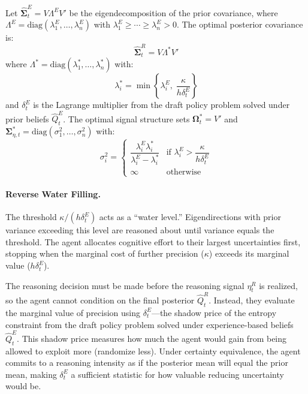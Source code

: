 \begin{proposition}
    Let $\hat{\boldsymbol{\Sigma}}^E_t = V \Lambda^E V'$ be the eigendecomposition of the prior covariance, where $\Lambda^E = \mathrm{diag}(\lambda_1^E, \ldots, \lambda_n^E)$ with $\lambda_1^E \geq \cdots \geq \lambda_n^E > 0$. The optimal posterior covariance is:
    \begin{equation}
        \hat{\boldsymbol{\Sigma}}^R_t = V \Lambda^* V'
    \end{equation}
    where $\Lambda^* = \mathrm{diag}(\lambda_1^*, \ldots, \lambda_n^*)$ with:
    \begin{equation}
        \lambda_i^* = \min\left\{ \lambda_i^E, \; \frac{\kappa}{h \delta^E_t} \right\}
    \end{equation}
    and $\delta^E_t$ is the Lagrange multiplier from the draft policy problem solved under prior beliefs $\hat{Q}^E_t$. The optimal signal structure sets $\boldsymbol{\Omega}^*_t = V'$ and $\boldsymbol{\Sigma}^*_{\eta,t} = \mathrm{diag}(\sigma_1^2, \ldots, \sigma_n^2)$ with:
    \begin{equation}
        \sigma_i^2 = \begin{cases} 
            \dfrac{\lambda_i^E \lambda_i^*}{\lambda_i^E - \lambda_i^*} & \text{if } \lambda_i^E > \dfrac{\kappa}{h\delta^E_t} \\[2ex]
            \infty & \text{otherwise}
        \end{cases}
    \end{equation}
\end{proposition}

\paragraph{Reverse Water Filling.} The threshold $\kappa/(h\delta^E_t)$ acts as a ``water level.'' 
Eigendirections with prior variance exceeding this level are reasoned about until 
variance equals the threshold. The agent allocates cognitive effort to their largest 
uncertainties first, stopping when the marginal cost of further precision ($\kappa$) 
exceeds its marginal value ($h\delta^E_t$).

The reasoning decision must be made before the reasoning signal $\eta^R_t$ is realized, 
so the agent cannot condition on the final posterior $\hat{Q}^R_t$. Instead, they 
evaluate the marginal value of precision using $\delta^E_t$—the shadow price of the 
entropy constraint from the draft policy problem solved under experience-based beliefs 
$\hat{Q}^E_t$. This shadow price measures how much the agent would gain from being 
allowed to exploit more (randomize less). Under certainty equivalence, the agent 
commits to a reasoning intensity as if the posterior mean will equal the prior mean, 
making $\delta^E_t$ a sufficient statistic for how valuable reducing uncertainty would be.